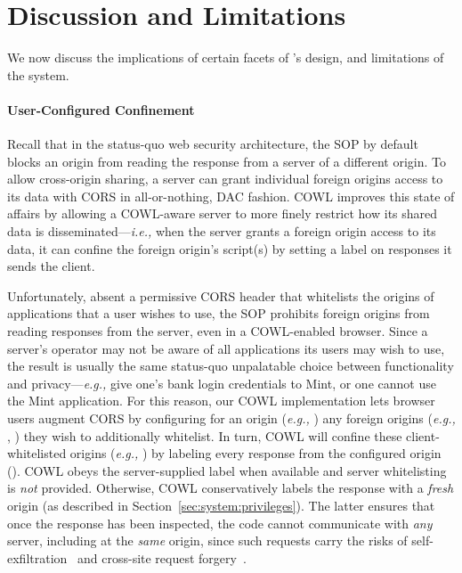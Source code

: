 \section{Discussion and Limitations}
\label{sec:discussion}

We now discuss the implications of certain facets of \sys{}'s
design, and limitations of the system.


\paragraph{User-Configured Confinement}
Recall that in the status-quo web security architecture, the SOP by
default blocks an origin from reading the response from a server of a
different origin. To allow cross-origin sharing, a server can
grant individual foreign origins access to its data with CORS in
all-or-nothing, DAC fashion.
%
COWL improves this state of affairs by allowing a COWL-aware server to
more finely restrict how its shared data is
disseminated---\emph{i.e.,} when the server grants a foreign origin
access to its data, it can confine the foreign origin's script(s) by
setting a label on responses it sends the client.

Unfortunately, absent a permissive CORS header that whitelists the
origins of applications that a user wishes to use, the SOP
prohibits foreign origins from reading responses from the server,
even in a COWL-enabled browser.
%
Since a server's operator may not be aware of all applications its
users may wish to use, the result is usually the same status-quo
unpalatable choice between functionality and privacy---\emph{e.g.,} give
one's bank login credentials to Mint, or one cannot use the Mint
application.
%
For this reason, our COWL implementation lets browser users augment
CORS by configuring for an origin (\emph{e.g.,} ) any
foreign origins (\emph{e.g.,} , )
they wish to additionally whitelist.
%
In turn, COWL will confine these client-whitelisted origins (\emph{e.g.,}
) by labeling every response from the configured
origin ().
%
COWL obeys the server-supplied label when available and server
whitelisting is \emph{not} provided. Otherwise, COWL conservatively
labels the response with a \emph{fresh} origin (as described in
Section~\ref{sec:system:privileges}). The latter ensures that once the
response has been inspected, the code cannot communicate with
\emph{any} server, including at the \emph{same} origin, since such
requests carry the risks of self-exfiltration~\cite{selfex} and
cross-site request forgery~\cite{CSRF}.
%



